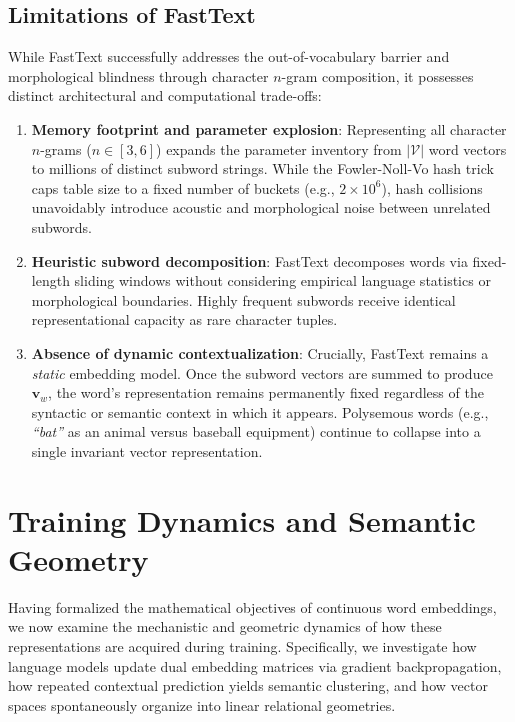 \documentclass[../../../main.tex]{subfiles}
\begin{document}
\clearpage

\subsection{Limitations of FastText}
\label{subsec:fasttext_limitations}

While FastText successfully addresses the out-of-vocabulary barrier and morphological blindness through character $n$-gram composition, it possesses distinct architectural and computational trade-offs:
\begin{enumerate}
    \item \textbf{Memory footprint and parameter explosion}: Representing all character $n$-grams ($n \in [3, 6]$) expands the parameter inventory from $|\mathcal{V}|$ word vectors to millions of distinct subword strings. While the Fowler-Noll-Vo hash trick caps table size to a fixed number of buckets (e.g., $2 \times 10^6$), hash collisions unavoidably introduce acoustic and morphological noise between unrelated subwords.
    \item \textbf{Heuristic subword decomposition}: FastText decomposes words via fixed-length sliding windows without considering empirical language statistics or morphological boundaries. Highly frequent subwords receive identical representational capacity as rare character tuples.
    \item \textbf{Absence of dynamic contextualization}: Crucially, FastText remains a \textit{static} embedding model. Once the subword vectors are summed to produce $\mathbf{v}_w$, the word's representation remains permanently fixed regardless of the syntactic or semantic context in which it appears. Polysemous words (e.g., \textit{``bat''} as an animal versus baseball equipment) continue to collapse into a single invariant vector representation.
\end{enumerate}

\clearpage
\section{Training Dynamics and Semantic Geometry}
\label{sec:training_dynamics_semantics}

Having formalized the mathematical objectives of continuous word embeddings, we now examine the mechanistic and geometric dynamics of how these representations are acquired during training. Specifically, we investigate how language models update dual embedding matrices via gradient backpropagation, how repeated contextual prediction yields semantic clustering, and how vector spaces spontaneously organize into linear relational geometries.
\end{document}
